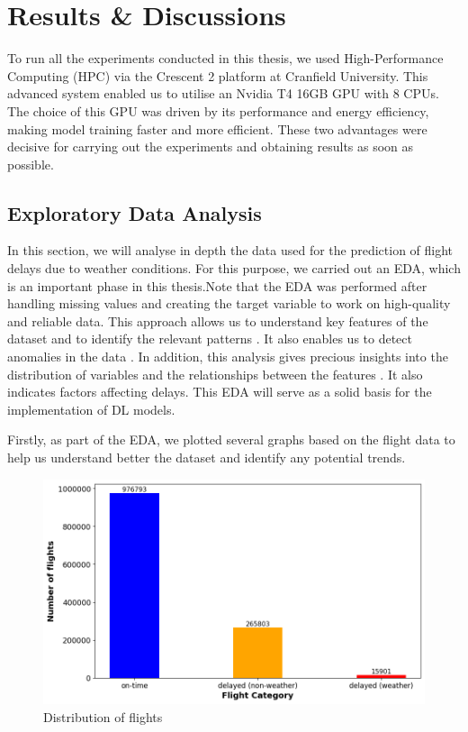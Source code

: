 \documentclass[12pt,oneside]{book} %
\begin{document}
\chapter{Results \& Discussions}


\noindent To run all the experiments conducted in this thesis, we used High-Performance Computing (HPC) via the Crescent 2 platform at Cranfield University. This advanced system enabled us to utilise an Nvidia T4 16GB GPU with 8 CPUs. The choice of this GPU was driven by its performance and energy efficiency, making model training faster and more efficient. These two advantages were decisive for carrying out the experiments and obtaining results as soon as possible.

\section{Exploratory Data Analysis}

\noindent In this section, we will analyse in depth the data used for the prediction of flight delays due to weather conditions. For this purpose, we carried out an EDA, which is an important phase in this thesis.Note that the EDA was performed after handling missing values and creating the target variable to work on high-quality and reliable data. This approach allows us to understand key features of the dataset and to identify the relevant patterns \cite{EDA}. It also enables us to detect anomalies in the data \cite{EDA}. In addition, this analysis gives precious insights into the distribution of variables and the relationships between the features \cite{EDA}. It also indicates factors affecting delays. This EDA will serve as a solid basis for the implementation of DL models.

\noindent Firstly, as part of the EDA, we plotted several graphs based on the flight data to help us understand better the dataset and identify any potential trends.

\begin{figure}[H]
    \centering
    \includegraphics[width=0.85\linewidth]{Image/EDA_1.png}
    \caption{\centering Distribution of flights}
    \label{fig:EDA_1}
\end{figure}
\end{document}
